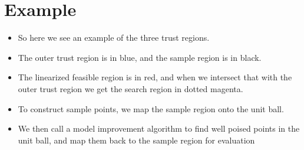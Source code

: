 \documentclass{article}
\begin{document}

	\section{Example}
\begin{itemize}
\item So here we see an example of the three trust regions.
\item The outer trust region is in blue, and the sample region is in black.
\item The linearized feasible region is in red, and when we intersect that with the outer trust region we get the search region in dotted magenta.
\item To construct sample points, we map the sample region onto the unit ball.
\item We then call a model improvement algorithm to find well poised points in the unit ball, and map them back to the sample region for evaluation
\end{itemize}
\end{document}
